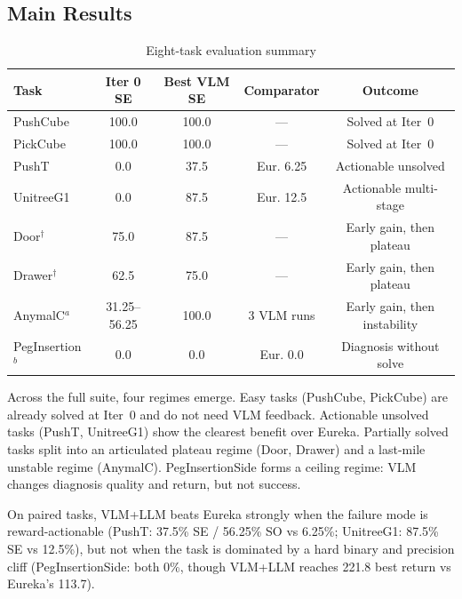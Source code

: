 \documentclass[conference]{IEEEtran}
\begin{document}
\subsection{Main Results}

\begin{table}[htbp]
\caption{Eight-task evaluation summary}
\label{tab:main}
\centering
\begin{tabular}{lcccc}
\toprule
Task & Iter 0 SE & Best VLM SE & Comparator & Outcome \\
\midrule
PushCube & 100.0 & 100.0 & --- & Solved at Iter~0 \\
PickCube & 100.0 & 100.0 & --- & Solved at Iter~0 \\
PushT & 0.0 & 37.5 & Eur. 6.25 & Actionable unsolved \\
UnitreeG1 & 0.0 & 87.5 & Eur. 12.5 & Actionable multi-stage \\
Door$^\dagger$ & 75.0 & 87.5 & --- & Early gain, then plateau \\
Drawer$^\dagger$ & 62.5 & 75.0 & --- & Early gain, then plateau \\
AnymalC$^a$ & 31.25--56.25 & 100.0 & 3 VLM runs & Early gain, then instability \\
PegInsertion$^b$ & 0.0 & 0.0 & Eur. 0.0 & Diagnosis without solve \\
\bottomrule
\end{tabular}
\end{table}


Across the full suite, four regimes emerge. Easy tasks (PushCube, PickCube) are
already solved at Iter~0 and do not need VLM feedback. Actionable unsolved
tasks (PushT, UnitreeG1) show the clearest benefit over Eureka. Partially
solved tasks split into an articulated plateau regime (Door, Drawer) and a
last-mile unstable regime (AnymalC). PegInsertionSide forms a ceiling regime:
VLM changes diagnosis quality and return, but not success.

On paired tasks, VLM+LLM beats Eureka strongly when the failure mode is
reward-actionable (PushT: 37.5\% SE / 56.25\% SO vs 6.25\%; UnitreeG1:
87.5\% SE vs 12.5\%), but not when the task is dominated by a hard binary and
precision cliff (PegInsertionSide: both 0\%, though VLM+LLM reaches 221.8 best
return vs Eureka's 113.7).
\end{document}
